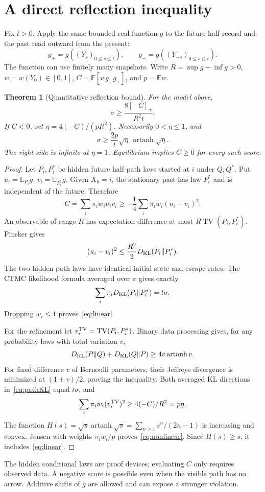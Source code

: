 \documentclass[11pt,a4paper]{article}
\newtheorem{theorem}{Theorem}
\newcommand{\E}{\mathbb E}\newcommand{\Prb}{\mathbb P}
\newcommand{\TV}{\operatorname{TV}}\newcommand{\atanh}{\operatorname{artanh}}
\begin{document}
\section{A direct reflection inequality}
Fix $t>0$. Apply the same bounded real function $g$ to the future half-record and the past read outward from the present:
\[
g_+=g((Y_s)_{0\leq s\leq t}),\qquad g_-=g((Y_{-s})_{0\leq s\leq t}).
\]
The function can use finitely many snapshots. Write $R=\sup g-\inf g>0$, $w=w(Y_0)\in[0,1]$, $C=\E[w g_-g_+]$, and $p=\E w$.
\begin{theorem}[Quantitative reflection bound]\label{thm:scalar}
For the model above,
\begin{equation}\label{eq:linear}
\boxed{\displaystyle\sigma\geq\frac{8[-C]_+}{R^2t}.}
\end{equation}
If $C<0$, set $\eta=4(-C)/(pR^2)$. Necessarily $0<\eta\leq1$, and
\begin{equation}\label{eq:nonlinear}
\boxed{\displaystyle\sigma\geq\frac{2p}{t}\sqrt\eta\,\atanh\sqrt\eta.}
\end{equation}
The right side is infinite at $\eta=1$. Equilibrium implies $C\geq0$ for every such score.
\end{theorem}
\begin{proof}
Let $P_i,P_i^*$ be hidden future half-path laws started at $i$ under $Q,Q^*$. Put $u_i=\E_{P_i}g$, $v_i=\E_{P_i^*}g$. Given $X_0=i$, the stationary past has law $P_i^*$ and is independent of the future. Therefore
\[
C=\sum_i\pi_iw_iu_iv_i\geq-\frac14\sum_i\pi_iw_i(u_i-v_i)^2.
\]
An observable of range $R$ has expectation difference at most $R\TV(P_i,P_i^*)$. Pinsker gives
\[
(u_i-v_i)^2\leq\frac{R^2}{2}D_{\mathrm{KL}}(P_i\Vert P_i^*).
\]
The two hidden path laws have identical initial state and escape rates. The CTMC likelihood formula averaged over $\pi$ gives exactly
\begin{equation}\label{eq:pathKL}
\sum_i\pi_iD_{\mathrm{KL}}(P_i\Vert P_i^*)=t\sigma.
\end{equation}
Dropping $w_i\leq1$ proves~\eqref{eq:linear}.

For the refinement let $v_i^{\rm TV}=\TV(P_i,P_i^*)$. Binary data processing gives, for any probability laws with total variation $v$,
\[
\KL(P\Vert Q)+\KL(Q\Vert P)\geq4v\atanh v.
\]
For fixed difference $v$ of Bernoulli parameters, their Jeffreys divergence is minimized at $(1\pm v)/2$, proving the inequality. Both averaged KL directions in~\eqref{eq:pathKL} equal $t\sigma$, and
\[
\sum_i\pi_iw_i(v_i^{\rm TV})^2\geq4(-C)/R^2=p\eta.
\]
The function $H(s)=\sqrt{s}\atanh\sqrt{s}=\sum_{n\geq1}s^n/(2n-1)$ is increasing and convex. Jensen with weights $\pi_iw_i/p$ proves~\eqref{eq:nonlinear}. Since $H(s)\geq s$, it includes~\eqref{eq:linear}.
\end{proof}
The hidden conditional laws are proof devices; evaluating $C$ only requires observed data. A negative score is possible even when the visible path has no arrow. Additive shifts of $g$ are allowed and can expose a stronger violation.
\end{document}
